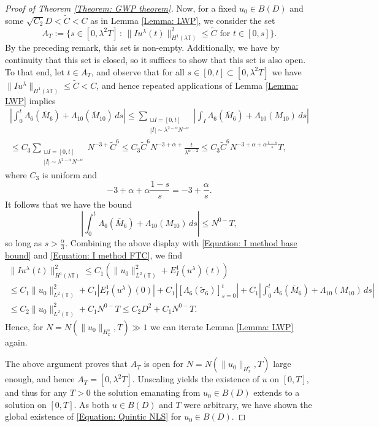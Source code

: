 \documentclass[12pt, letterpaper]{amsart}
\begin{document}
\begin{proof}[Proof of Theorem \ref{Theorem: GWP theorem}]
    Now, for a fixed $u_0\in B(D)$ and some $\sqrt{C_2} D < \tilde{C} < C$ as in Lemma \ref{Lemma: LWP}, we consider the set
    \[
    A_T := \{s\in [0, \lambda^2 T] \, : \, \|Iu^{\lambda}(t)\|_{H^1(\lambda\mathbb{T})}^2 \leq \tilde{C}\mbox{ for } t\in [0,s]\}.
    \]
    By the preceding remark, this set is non-empty. Additionally, we have by continuity that this set is closed, so it suffices to show that this set is also open. To that end, let $t\in A_T$, and observe that for all $s \in [0,t]\subset [0, \lambda^2 T]$ we have $\|Iu^\lambda\|_{H^1(\lambda\mathbb{T})}\leq \tilde{C} < C$, and hence repeated applications of Lemma \ref{Lemma: LWP} implies
    \begin{multline}
        \left|\int_0^t \Lambda_6(\overline{M}_6) + \Lambda_{10}(\overline{M}_{10})\,ds\right|\leq \sum_{\substack{\sqcup I = [0,t]\\ |I|\sim \lambda^{2-\alpha}N^{-\alpha}}}\left|\int_I \Lambda_6(\overline{M}_6) + \Lambda_{10}(M_{10})\,ds\right|\\
        \leq C_3\sum_{\substack{\sqcup I = [0,t]\\ |I|\sim \lambda^{2-\alpha}N^{-\alpha}}}N^{-3+}\tilde{C}^6\leq C_3\tilde{C}^6N^{-3+\alpha+}\frac{t}{\lambda^{\alpha-2}}\leq C_3\tilde{C}^6N^{-3+\alpha+\alpha\frac{1-s}{s}}T,
    \end{multline}
    where $C_3$ is uniform and 
    \[
-3+\alpha+\alpha\frac{1-s}{s} = -3+\frac{\alpha}{s}.
    \]
    It follows that we have the bound
    \[
    \left|\int_0^t \Lambda_6(\overline{M}_6) + \Lambda_{10}(M_{10})\,ds\right|\leq N^{0-}T,
    \]
    so long as $s > \frac{\alpha}{3}$. Combining the above display with \eqref{Equation: I method base bound} and \eqref{Equation: I method FTC}, we find
    \begin{multline*}
        \|Iu^\lambda(t)\|_{H^1(\lambda\mathbb{T})}^2\leq C_1(\|u_0\|_{L^2(\mathbb{T})}^2 + E^1_I(u^{\lambda})(t))\\
        \leq C_1\|u_0\|_{L^2(\mathbb{T})}^2 + C_1|E^1_I(u^{\lambda})(0)| + C_1\left|[\Lambda_6(\tilde{\sigma}_6)]_{s=0}^t\right| + C_1\left|\int_0^t \Lambda_6(\overline{M}_6) + \Lambda_{10}(M_{10})\,ds\right|\\
        \leq C_2\|u_0\|_{L^2(\mathbb{T})}^2 + C_1N^{0-}T\leq C_2D^2 + C_1 N^{0-}T.
    \end{multline*}
    Hence, for $N = N(\|u_0\|_{H^s_x}, T)\gg 1$ we can iterate Lemma \ref{Lemma: LWP} again. 
    
    The above argument proves that $A_T$ is open for $N = N(\|u_0\|_{H^s_x}, T)$ large enough, and hence $A_T = [0,\lambda^2T]$. Unscaling yields the existence of $u$ on $[0,T]$, and thus for any $T > 0$ the solution emanating from $u_0\in B(D)$ extends to a solution on $[0,T]$. As both $u\in B(D)$ and $T$ were arbitrary, we have shown the global existence of \eqref{Equation: Quintic NLS} for $u_0\in B(D)$.
\end{proof}
\end{document}
